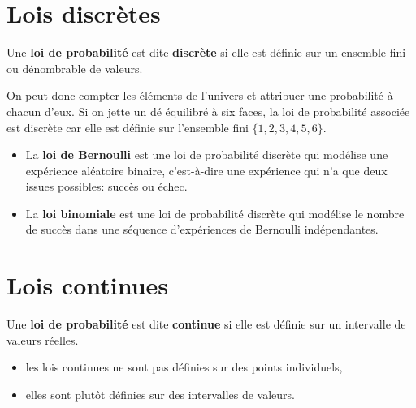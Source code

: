 \def\level{BTS}  %
\def\course{CIEL 2}
\def\chaptername{Lois continues} %
\def\docpart{Généralités sur les lois continues} %
\def\docname{C221}        %

\pagestyle{cours_FP}
\makeheaderBTS{} %

\section{Lois discrètes}

\begin{propriete}{}
Une \textbf{loi de probabilité} est dite \textbf{discrète} si elle est définie sur un ensemble fini ou dénombrable de valeurs.

On peut donc compter les éléments de l'univers et attribuer une probabilité à chacun d'eux. Si on jette un dé équilibré à six faces, la loi de probabilité associée est discrète car elle est définie sur l'ensemble fini $\{1, 2, 3, 4, 5, 6\}$.
\end{propriete}

\begin{exemple}[\quad]{}
	\begin{itemize}
		\item La \textbf{loi de Bernoulli} est une loi de probabilité discrète qui modélise une expérience aléatoire binaire, c'est-à-dire une expérience qui n'a que deux issues possibles: succès ou échec.
		\item La \textbf{loi binomiale} est une loi de probabilité discrète qui modélise le nombre de succès dans une séquence d'expériences de Bernoulli indépendantes.
	\end{itemize}
\end{exemple}


\section{Lois continues}

\begin{definition}{}
Une \textbf{loi de probabilité} est dite \textbf{continue} si elle est définie sur un intervalle de valeurs réelles. 

\begin{itemize}
	\item les lois continues ne sont pas définies sur des points individuels,
	\item elles sont plutôt définies sur des intervalles de valeurs.
\end{itemize}
\end{definition}

